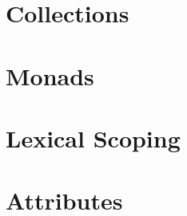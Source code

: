 \documentclass[sigplan,10pt]{acmart}
\begin{document}











\section{Collections}

\section{Monads}

\section{Lexical Scoping}

\section{Attributes}

%

%
%
\end{document}
